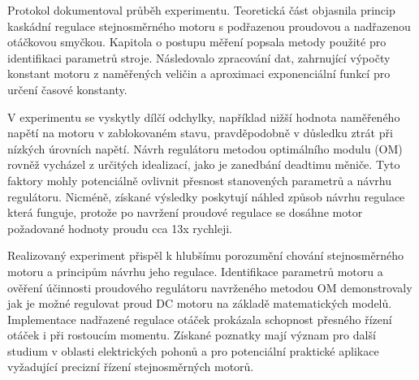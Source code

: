 \documentclass{protokol}
\begin{document}
Protokol dokumentoval průběh experimentu. Teoretická část objasnila princip kaskádní regulace stejnosměrného motoru s podřazenou proudovou a nadřazenou otáčkovou smyčkou. Kapitola o postupu měření popsala metody použité pro identifikaci parametrů stroje. Následovalo zpracování dat, zahrnující výpočty konstant motoru z naměřených veličin a aproximaci exponenciální funkcí pro určení časové konstanty.

V experimentu se vyskytly dílčí odchylky, například nižší hodnota naměřeného napětí na motoru v zablokovaném stavu, pravděpodobně v důsledku ztrát při nízkých úrovních napětí. Návrh regulátoru metodou optimálního modulu (OM) rovněž vycházel z určitých idealizací, jako je zanedbání deadtimu měniče. Tyto faktory mohly potenciálně ovlivnit přesnost stanovených parametrů a návrhu regulátoru. Nicméně, získané výsledky poskytují náhled způsob návrhu regulace která funguje, protože po navržení proudové regulace se dosáhne motor požadované hodnoty proudu cca 13x rychleji.

Realizovaný experiment přispěl k hlubšímu porozumění chování stejnosměrného motoru a principům návrhu jeho regulace. Identifikace parametrů motoru a ověření účinnosti proudového regulátoru navrženého metodou OM demonstrovaly jak je možné regulovat proud DC motoru na základě matematických modelů. Implementace nadřazené regulace otáček prokázala schopnost přesného řízení otáček i při rostoucím momentu. Získané poznatky mají význam pro další studium v oblasti elektrických pohonů a pro potenciální praktické aplikace vyžadující precizní řízení stejnosměrných motorů.
\end{document}
